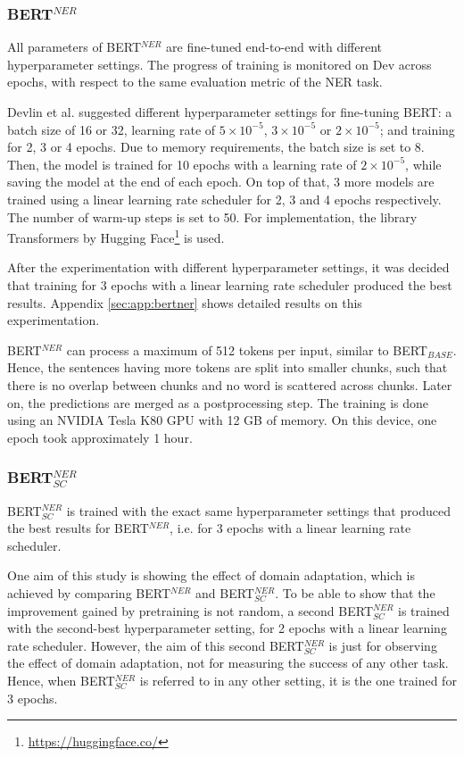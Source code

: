 \documentclass{report}
\theoremstyle{definition}
\theoremstyle{remark}
\begin{document}
\subsubsection{BERT$^{NER}$}
All parameters of BERT$^{NER}$ are fine-tuned end-to-end with different hyperparameter settings. The progress of training is monitored on Dev across epochs, with respect to the same evaluation metric of the NER task.

Devlin et al. \cite{BERT} suggested different hyperparameter settings for fine-tuning BERT: a batch size of 16 or 32, learning rate of $5\times10^{-5}$, $3\times10^{-5}$ or $2\times10^{-5}$; and training for 2, 3 or 4 epochs. Due to memory requirements, the batch size is set to 8. Then, the model is trained for 10 epochs with a learning rate of $2\times10^{-5}$, while saving the model at the end of each epoch. On top of that, 3 more models are trained using a linear learning rate scheduler for 2, 3 and 4 epochs respectively. The number of warm-up steps is set to 50. For implementation, the library Transformers \cite{huggingface} by Hugging Face\footnote{\url{https://huggingface.co/}} is used.

After the experimentation with different hyperparameter settings, it was decided that training for 3 epochs with a linear learning rate scheduler produced the best results. Appendix \ref{sec:app:bertner} shows detailed results on this experimentation.

BERT$^{NER}$ can process a maximum of 512 tokens per input, similar to BERT$_{BASE}$. Hence, the sentences having more tokens are split into smaller chunks, such that there is no overlap between chunks and no word is scattered across chunks. Later on, the predictions are merged as a postprocessing step. The training is done using an NVIDIA Tesla K80 GPU with 12 GB of memory. On this device, one epoch took approximately 1 hour. 
\subsubsection{BERT$^{NER}_{SC}$}
BERT$^{NER}_{SC}$ is trained with the exact same hyperparameter settings that produced the best results for BERT$^{NER}$, i.e. for 3 epochs with a linear learning rate scheduler.

One aim of this study is showing the effect of domain adaptation, which is achieved by comparing BERT$^{NER}$ and BERT$^{NER}_{SC}$. To be able to show that the improvement gained by pretraining is not random, a second BERT$^{NER}_{SC}$ is trained with the second-best hyperparameter setting, for 2 epochs with a linear learning rate scheduler. However, the aim of this second BERT$^{NER}_{SC}$ is just for observing the effect of domain adaptation, not for measuring the success of any other task. Hence, when BERT$^{NER}_{SC}$ is referred to in any other setting, it is the one trained for 3 epochs.
\end{document}
